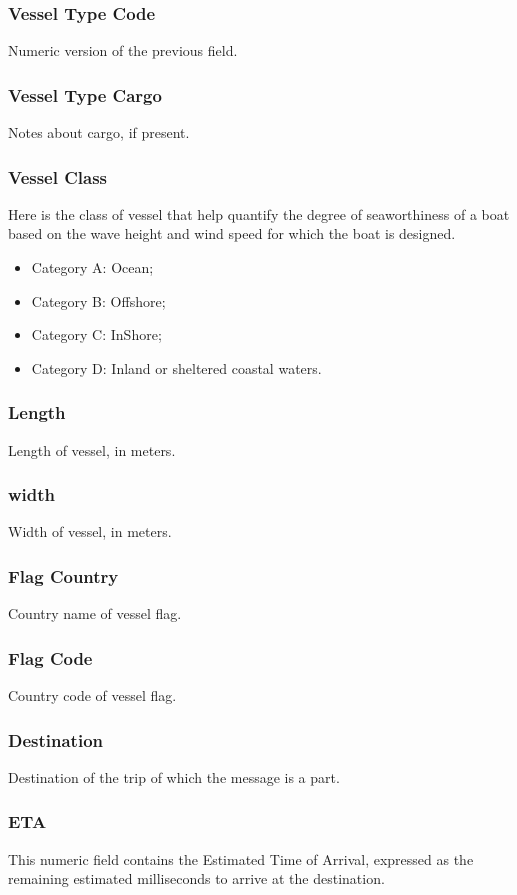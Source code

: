 \subsubsection{Vessel Type Code}
    Numeric version of the previous field.
\subsubsection{Vessel Type Cargo}
    Notes about cargo, if present.
\subsubsection{Vessel Class}
    Here is the class of vessel that help quantify the degree of seaworthiness of a boat based on the wave height and wind speed for which the boat is designed.\cite{vessel_classes}
    
    \begin{itemize}
    \item Category A: Ocean;
    \item Category B: Offshore;
    \item Category C: InShore;
    \item Category D: Inland or sheltered coastal waters.
    \end{itemize}

    
\subsubsection{Length}
    Length of vessel, in meters.
\subsubsection{width}
    Width of vessel, in meters.
\subsubsection{Flag Country}
    Country name of vessel flag.
\subsubsection{Flag Code}
    Country code of vessel flag.
\subsubsection{Destination}
    Destination of the trip of which the message is a part.
\subsubsection{ETA}
    This numeric field contains the Estimated Time of Arrival, expressed as the remaining estimated milliseconds to arrive at the destination.
